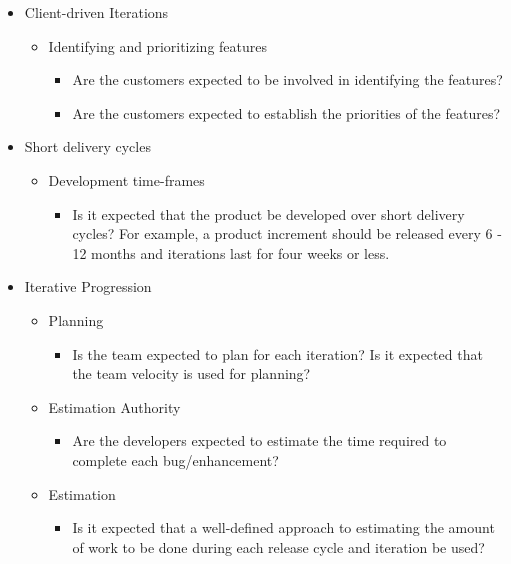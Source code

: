 \begin{appendices}
\begin{itemize}
\begin{itemize}
\begin{itemize}
				\end{itemize}
		\end{itemize}
	\item Client-driven Iterations
		\begin{itemize}
			\item Identifying and prioritizing features
				\begin{itemize}
					\item Are the customers expected to be involved in identifying the features?
					\item Are the customers expected to establish the priorities of the features?
				\end{itemize}
		\end{itemize}
	\item Short delivery cycles
		\begin{itemize}
			\item Development time-frames
				\begin{itemize}
					\item Is it expected that the product be developed over short delivery cycles? For example, a product increment should be released every 6 - 12 months and iterations last for four weeks or less.
				\end{itemize}
		\end{itemize}
	\item Iterative Progression
		\begin{itemize}
			\item Planning
				\begin{itemize}
					\item Is the team expected to plan for each iteration?
					\addition Is it expected that the team velocity is used for planning?
				\end{itemize}
			\item Estimation Authority
				\begin{itemize}
					\item Are the developers expected to estimate the time required to complete each bug/enhancement?
				\end{itemize}
			\item Estimation
				\begin{itemize}
					\item Is it expected that a well-defined approach to estimating the amount of work to be done during each release cycle and iteration be used?

\end{itemize}
\end{itemize}
\end{itemize}
\end{appendices}
